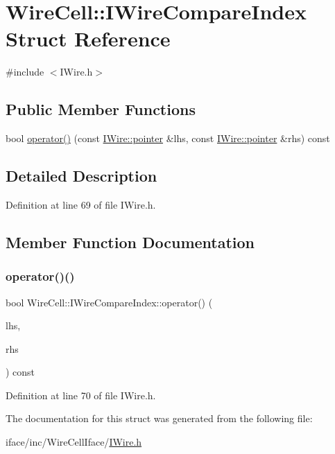 \hypertarget{struct_wire_cell_1_1_i_wire_compare_index}{}\section{Wire\+Cell\+:\+:I\+Wire\+Compare\+Index Struct Reference}
\label{struct_wire_cell_1_1_i_wire_compare_index}


{\ttfamily \#include $<$I\+Wire.\+h$>$}

\subsection*{Public Member Functions}
\begin{DoxyCompactItemize}
\item 
bool \hyperlink{struct_wire_cell_1_1_i_wire_compare_index_a81daa1f01e8faad3de12a340f5c7b839}{operator()} (const \hyperlink{class_wire_cell_1_1_i_data_aff870b3ae8333cf9265941eef62498bc}{I\+Wire\+::pointer} \&lhs, const \hyperlink{class_wire_cell_1_1_i_data_aff870b3ae8333cf9265941eef62498bc}{I\+Wire\+::pointer} \&rhs) const
\end{DoxyCompactItemize}


\subsection{Detailed Description}


Definition at line 69 of file I\+Wire.\+h.



\subsection{Member Function Documentation}
\mbox{\label{struct_wire_cell_1_1_i_wire_compare_index_a81daa1f01e8faad3de12a340f5c7b839}} 
\subsubsection{\texorpdfstring{operator()()}{operator()()}}
{\footnotesize\ttfamily bool Wire\+Cell\+::\+I\+Wire\+Compare\+Index\+::operator() (\begin{DoxyParamCaption}\item[{const \hyperlink{class_wire_cell_1_1_i_data_aff870b3ae8333cf9265941eef62498bc}{I\+Wire\+::pointer} \&}]{lhs,  }\item[{const \hyperlink{class_wire_cell_1_1_i_data_aff870b3ae8333cf9265941eef62498bc}{I\+Wire\+::pointer} \&}]{rhs }\end{DoxyParamCaption}) const\hspace{0.3cm}{\ttfamily [inline]}}



Definition at line 70 of file I\+Wire.\+h.



The documentation for this struct was generated from the following file\+:\begin{DoxyCompactItemize}
\item 
iface/inc/\+Wire\+Cell\+Iface/\hyperlink{_i_wire_8h}{I\+Wire.\+h}\end{DoxyCompactItemize}

